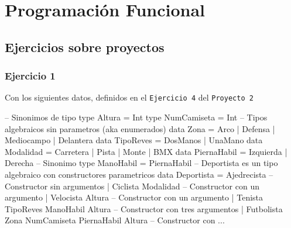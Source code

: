 \documentclass{article}
\begin{document}
\section{Programación Funcional}

\subsection{Ejercicios sobre proyectos} 

\subsubsection{Ejercicio 1}
Con los siguientes datos, definidos en el \texttt{Ejercicio 4} del \texttt{Proyecto 2}
\begin{haskell}
-- Sinonimos de tipo
type Altura = Int
type NumCamiseta = Int
-- Tipos algebraicos sin parametros (aka enumerados)
data Zona = Arco | Defensa | Mediocampo | Delantera
data TipoReves = DosManos | UnaMano
data Modalidad = Carretera | Pista | Monte | BMX
data PiernaHabil = Izquierda | Derecha
-- Sinonimo
type ManoHabil = PiernaHabil
-- Deportista es un tipo algebraico con constructores parametricos
data Deportista = Ajedrecista                        -- Constructor sin argumentos
    | Ciclista Modalidad                             -- Constructor con un argumento
    | Velocista Altura                               --  Constructor con un argumento
    | Tenista TipoReves ManoHabil Altura             -- Constructor con tres argumentos
    | Futbolista Zona NumCamiseta PiernaHabil Altura -- Constructor con ...
\end{haskell}
\end{document}

